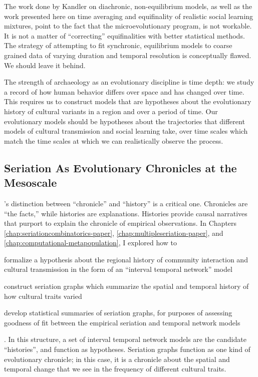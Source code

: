 The work done by Kandler on diachronic, non-equilibrium models, as well as the work presented here on time averaging and equifinality of realistic social learning mixtures, point to the fact that the microevolutionary program, is not workable.  It is not a matter of ``correcting'' equifinalities with better statistical methods.  The strategy of attempting to fit synchronic, equilibrium models to coarse grained data of varying duration and temporal resolution is conceptually flawed.  We should leave it behind.

The strength of archaeology as an evolutionary discipline is time depth:  we study a record of how human behavior differs over space and has changed over time.  This requires us to construct models that are hypotheses about the evolutionary history of cultural variants in a region and over a period of time.  Our evolutionary models should be hypotheses about the trajectories that different models of cultural transmission and social learning take, over time scales which match the time scales at which we can realistically observe the process.  

\subsection{Seriation As Evolutionary Chronicles at the Mesoscale}\label{conc:sec:conc-seriation}

\citet{OHara1988}'s distinction between ``chronicle'' and ``history'' is a critical one.  Chronicles are ``the facts,'' while histories are explanations.  Histories provide causal narratives that purport to explain the chronicle of empirical observations. In Chapters \ref{chap:seriationcombinatorics-paper}, \ref{chap:multipleseriation-paper}, and \ref{chap:computational-metapopulation}, I explored how to \begin{dissparalist}
\item formalize a hypothesis about the regional history of community interaction and cultural transmission in the form of an ``interval temporal network'' model
\item construct seriation graphs which summarize the spatial and temporal history of how cultural traits varied 
\item develop statistical summaries of seriation graphs, for purposes of assessing goodness of fit between the empirical seriation and temporal network models
\end{dissparalist}.  In this structure, a set of interval temporal network models are the candidate ``histories'', and function as hypotheses.  Seriation graphs function as one kind of evolutionary chronicle; in this case, it is a chronicle about the spatial and temporal change that we see in the frequency of different cultural traits.  

